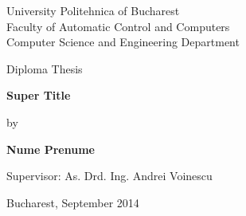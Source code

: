 

\pagestyle{empty}
\sffamily

\noindent
\begin{center}
    \Large
    University Politehnica of Bucharest\\
    Faculty of Automatic Control and Computers \\
    Computer Science and Engineering Department \\
\end{center}

\vfill\vfill
\begin{center}
    \Large
    Diploma Thesis\\
\end{center}

\vfill
\begin{center}
	\HUGE\bfseries
	Super Title\\
\vfill
	\large
	
\end{center}

\vfill
\begin{center}
    \Large
    by
\end{center}

\vfill
\begin{center}
    \huge\bfseries
    Nume Prenume
\end{center}

\vfill\vfill\vfill
\begin{center}
	\Large
	Supervisor: As. Drd. Ing. Andrei Voinescu\\
\end{center}

\vfill
\begin{center}
\large
    Bucharest, September 2014
\end{center}

\cleardoublepage

\pagestyle{headings}
\tableofcontents

